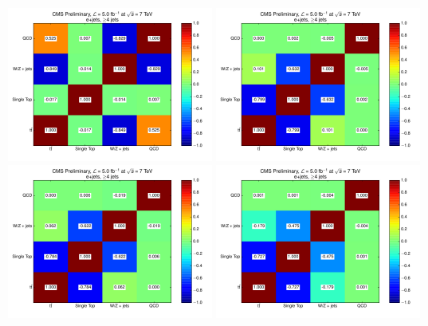 \begin{figure}[H]
    \centering
     \includegraphics[width=0.48\textwidth]{Chapters/07_08_09_Analysis/Images/fitchecks/7TeV/Correlations_electron_MET_0-27.pdf}\hfill
     \includegraphics[width=0.48\textwidth]{Chapters/07_08_09_Analysis/Images/fitchecks/7TeV/Correlations_electron_MET_27-52.pdf}\\
	 \includegraphics[width=0.48\textwidth]{Chapters/07_08_09_Analysis/Images/fitchecks/7TeV/Correlations_electron_MET_52-87.pdf}\hfill
	 \includegraphics[width=0.48\textwidth]{Chapters/07_08_09_Analysis/Images/fitchecks/7TeV/Correlations_electron_MET_87-130.pdf}\\

\end{figure}
